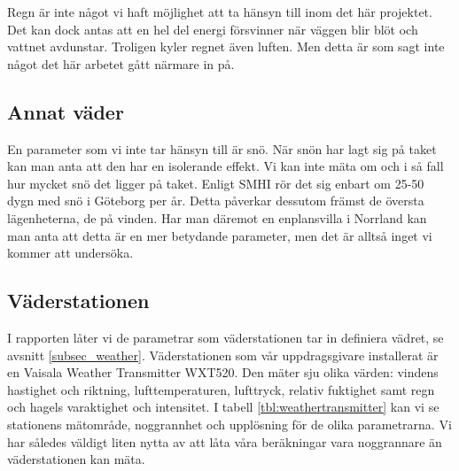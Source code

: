 Regn är inte något vi haft möjlighet att ta hänsyn till inom det här projektet. Det kan dock antas att en hel del energi försvinner när väggen blir blöt och vattnet avdunstar. Troligen kyler regnet även luften. Men detta är som sagt inte något det här arbetet gått närmare in på.

\subsection{Annat väder}
En parameter som vi inte tar hänsyn till är snö. När snön har lagt sig på taket kan man anta att den har en isolerande effekt. Vi kan inte mäta om och i så fall hur mycket snö det ligger på taket. Enligt SMHI %
rör det sig enbart om 25-50 dygn med snö i Göteborg per år. Detta påverkar dessutom främst de översta lägenheterna, de på vinden. Har man däremot en enplansvilla i Norrland kan man anta att detta är en mer betydande parameter, men det är alltså inget vi kommer att undersöka.

\subsection{Väderstationen}
\label{subsec_weathertransmitter}
I rapporten låter vi de parametrar som väderstationen tar in definiera vädret, se avsnitt \ref{subsec_weather}. Väderstationen som vår uppdragsgivare installerat är en Vaisala Weather Transmitter WXT520. Den mäter sju olika värden: vindens hastighet och riktning, lufttemperaturen, lufttryck, relativ fuktighet samt regn och hagels varaktighet och intensitet. I tabell \ref{tbl:weathertransmitter} kan vi se stationens mätområde, noggrannhet och upplösning för de olika parametrarna. Vi har således väldigt liten nytta av att låta våra beräkningar vara noggrannare än väderstationen kan mäta.

